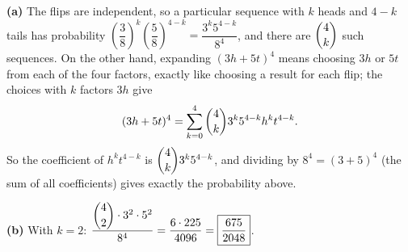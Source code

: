 \textbf{(a)} The flips are independent, so a particular sequence with $k$ heads and $4-k$ tails has probability $\left(\dfrac38\right)^k\left(\dfrac58\right)^{4-k}=\dfrac{3^k5^{4-k}}{8^4}$, and there are $\dbinom4k$ such sequences. On the other hand, expanding $(3h+5t)^4$ means choosing $3h$ or $5t$ from each of the four factors, exactly like choosing a result for each flip; the choices with $k$ factors $3h$ give
\[(3h+5t)^4=\sum_{k=0}^{4}\dbinom4k3^k5^{4-k}h^kt^{4-k}.\]
So the coefficient of $h^kt^{4-k}$ is $\dbinom4k3^k5^{4-k}$, and dividing by $8^4=(3+5)^4$ (the sum of all coefficients) gives exactly the probability above.

\textbf{(b)} With $k=2$: $\dfrac{\dbinom42\cdot3^2\cdot5^2}{8^4}=\dfrac{6\cdot225}{4096}=\boxed{\dfrac{675}{2048}}$.
